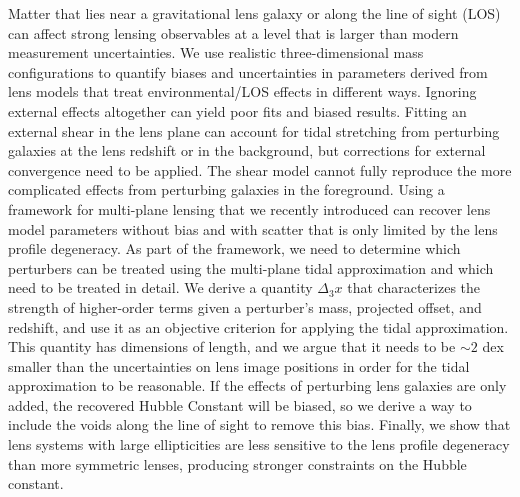 Matter that lies near a gravitational lens galaxy or along the line of sight (LOS) can affect strong lensing observables at a level that is larger than modern measurement uncertainties. We use realistic three-dimensional mass configurations to quantify biases and uncertainties in parameters derived from lens models that treat environmental/LOS effects in different ways. Ignoring external effects altogether can yield poor fits and biased results. Fitting an external shear in the lens plane can account for tidal stretching from perturbing galaxies at the lens redshift or in the background, but corrections for external convergence need to be applied. The shear model cannot fully reproduce the more complicated effects from perturbing galaxies in the foreground. Using a framework for multi-plane lensing that we recently introduced \citep{McCully14} can recover lens model parameters without bias and with scatter that is only limited by the lens profile degeneracy. As part of the framework, we need to determine which perturbers can be treated using the multi-plane tidal approximation and which need to be treated in detail. We derive a quantity $\Delta_3 x$ that characterizes the strength of higher-order terms given a perturber's mass, projected offset, and redshift, and use it as an objective criterion for applying the tidal approximation. This quantity has dimensions of length, and we argue that it needs to be $\sim 2$ dex smaller than the uncertainties on lens image positions in order for the tidal approximation to be reasonable. If the effects of perturbing lens galaxies are only added, the recovered Hubble Constant will be biased, so we derive a way to include the voids along the line of sight to remove this bias. Finally, we show that lens systems with large ellipticities are less sensitive to the lens profile degeneracy than more symmetric lenses, producing stronger constraints on the Hubble constant.
  